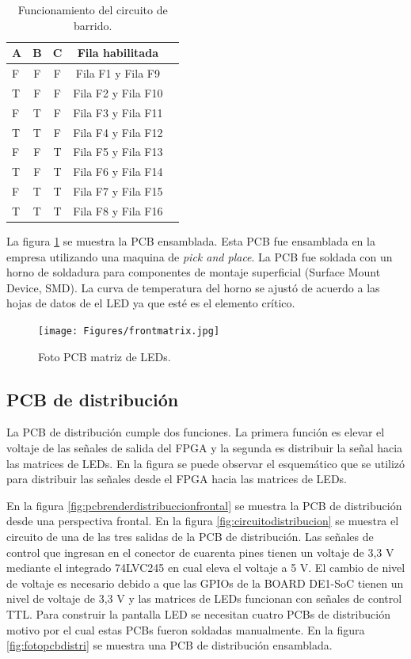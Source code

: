 \begin{table}[h]
\centering
\caption[Funcionamiento circuito barrido]{Funcionamiento del circuito de barrido.}
\begin{tabular}{l c c c c}
\toprule
\textbf{A}& \textbf{B} & \textbf{C} & \textbf{Fila habilitada}\\
\midrule 


F &F &F &Fila F1 y Fila F9\\
T &F &F &Fila F2 y Fila F10\\
F &T &F &Fila F3 y Fila F11\\
T &T &F &Fila F4 y Fila F12\\
F &F &T &Fila F5 y Fila F13\\
T &F &T &Fila F6 y Fila F14\\
F &T &T &Fila F7 y Fila F15\\
T &T &T &Fila F8 y Fila F16\\


\bottomrule
\hline
\end{tabular}
\label{tab:funcionamientobarrido}
\end{table}


La figura \ref{fig:fotomatrixled} se muestra la PCB ensamblada. Esta PCB fue ensamblada en la empresa utilizando una maquina de \textit{pick and place}. La PCB fue soldada con un horno de soldadura para componentes de montaje superficial (Surface Mount Device, SMD). La curva de temperatura del horno se ajustó de acuerdo a las hojas de datos de el LED ya que esté es el elemento crítico.

\begin{figure}[htpb]
	\centering
    \texttt{[image: Figures/frontmatrix.jpg]} 
	\caption{Foto PCB matriz de LEDs.}
	\label{fig:fotomatrixled}
\end{figure}



\subsection{PCB de distribución}
La PCB de distribución cumple dos funciones. La primera función es elevar el voltaje de las señales de salida del FPGA y la segunda es distribuir la señal hacia las matrices de LEDs. En la figura se puede observar el esquemático que se utilizó para distribuir las señales desde el FPGA hacia las matrices de LEDs. 

En la figura \ref{fig:pcbrenderdistribuccionfrontal}  se muestra la PCB de distribución desde una perspectiva frontal. En la figura \ref{fig:circuitodistribucion} se muestra el circuito de una de las tres salidas de la PCB de distribución. Las señales de control que ingresan en el conector de cuarenta pines tienen un voltaje de 3,3 V mediante el integrado 74LVC245 en cual eleva el voltaje a 5 V. El cambio de nivel de voltaje es necesario debido a que las GPIOs de la BOARD DE1-SoC tienen un nivel de voltaje de 3,3 V y las matrices de LEDs funcionan con señales de control TTL. Para construir la pantalla LED se necesitan cuatro PCBs de distribución motivo por el cual estas PCBs fueron soldadas manualmente. En la figura \ref{fig:fotopcbdistri} se muestra una PCB de distribución ensamblada. 

